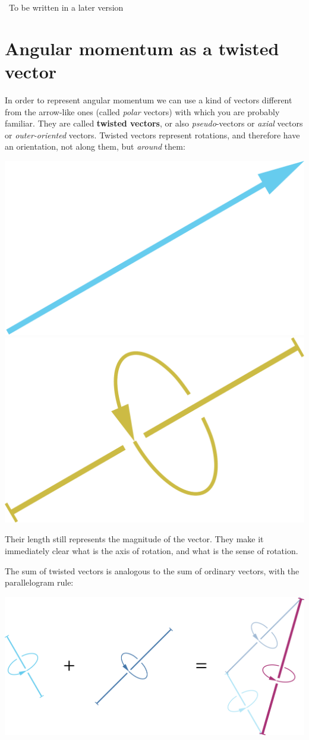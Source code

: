 \documentclass[a4paper,12pt,%
onecolumn,oneside,%
british%
]{memoir}
\newcommand{\mynotew}[1]{{\footnotesize\color{midgrey}\faIcon{tools}\ #1}}
\renewcommand*{\|}[1][]{\nonscript\:#1\vert\nonscript\:\mathopen{}}
\begin{document}
\mynotew{To be written in a later version}

\section{Angular momentum as a twisted vector}
\label{sec:twisted_vec}

In order to represent angular momentum we can use a kind of vectors different from the arrow-like ones (called \emph{polar} vectors) with which you are probably familiar. They are called \textbf{twisted vectors}, or also \emph{pseudo}-vectors or \emph{axial} vectors or \emph{outer-oriented} vectors. Twisted vectors represent rotations, and therefore have an orientation, not along them, but \emph{around} them:
\begin{center}
\includegraphics[width=0.34\linewidth]{images/io-vector.pdf}%
\hspace*{0.12\linewidth}\includegraphics[width=0.34\linewidth]{images/oo-vector.pdf}%
%
\\\footnotesize
{}\hspace*{0.46\linewidth}
\end{center}
Their length still represents the magnitude of the vector. They make it immediately clear what is the axis of rotation, and what is the sense of rotation.

The sum of twisted vectors is analogous to the sum of ordinary vectors, with the parallelogram rule:
\begin{center}
\includegraphics[width=0.67\linewidth]{images/tvectorsum.pdf}%
\end{center}
\end{document}
